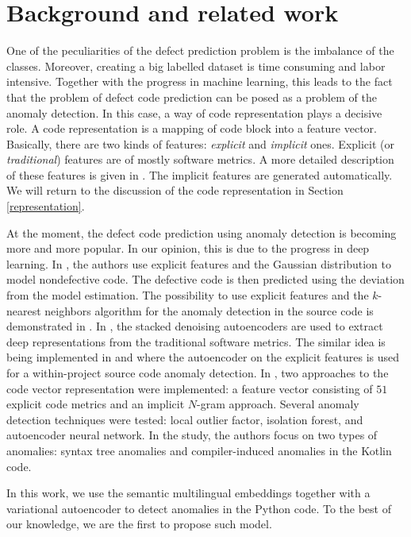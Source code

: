 \documentclass[conference]{ieeetran}
\begin{document}
\section{Background and related work}\label{related}


One of the peculiarities of the defect prediction problem is the imbalance of the classes.
Moreover, creating a big labelled dataset is time consuming and labor intensive.
Together with the progress in machine learning,
 this leads to the fact that the problem of defect code prediction can be posed as a problem of the anomaly detection.
In this case, a way of code representation plays a decisive role.
A code representation is a mapping of code block into a feature vector.
Basically, there are two kinds of features: {\it explicit} and {\it implicit} ones.
Explicit (or {\it traditional}) features are of mostly software metrics.
A more detailed description of these features is given in \cite[Appendix]{AfricEtAl2020}.
The implicit features are generated automatically. 
We will return to the discussion of the code representation in Section \ref{representation}. 

At the moment, the defect code prediction using anomaly detection is becoming more and more popular.
In our opinion, this is due to the progress in deep learning.
In \cite{NeelaEtAl2017}, the authors use explicit features and the Gaussian distribution to model nondefective code.
The defective code is then predicted using the deviation from the model estimation.
The possibility to use explicit features and the $k$-nearest neighbors algorithm
  for the anomaly detection in the source code is demonstrated in \cite{MoshtariEtAl2020}.
In \cite{TongEtAl2018}, the stacked denoising autoencoders are used to extract deep representations from the traditional software metrics.
The similar idea is being implemented in \cite{SakuradaYairi2014} and  \cite{AfricEtAl2020}
 where the autoencoder on the explicit features is used for a within-project source code anomaly detection.
In \cite{BryksinEtAl2020}, two approaches to the code vector representation were implemented:
 a feature vector consisting of $51$ explicit code metrics and an implicit $N$-gram approach.
Several anomaly detection techniques were tested:
 local outlier factor, isolation forest, and autoencoder neural network.
In the study, the authors focus on two types of anomalies: syntax tree anomalies and compiler-induced anomalies in the Kotlin code.

In this work, we use the semantic multilingual embeddings together with a variational autoencoder to detect anomalies in the Python code.
To the best of our knowledge, we are the first to propose such model.
\end{document}

